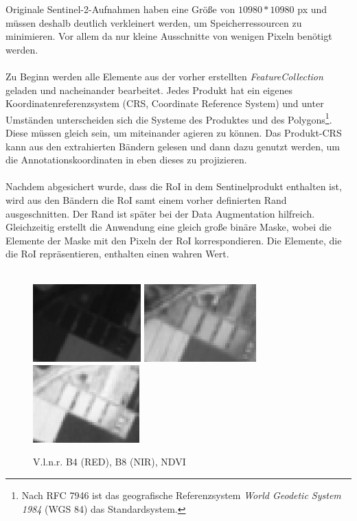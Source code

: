Originale Sentinel-2-Aufnahmen haben eine Größe von $10980*10980$ px und müssen deshalb deutlich verkleinert werden, um Speicherressourcen zu minimieren. Vor allem da nur kleine Ausschnitte von wenigen Pixeln benötigt werden. 
\\\\
Zu Beginn werden alle Elemente aus der vorher erstellten \textit{FeatureCollection} geladen und nacheinander bearbeitet. Jedes Produkt hat ein eigenes Koordinatenreferenzsystem (CRS, Coordinate Reference System) und unter Umständen unterscheiden sich die Systeme des Produktes und des Polygons\footnote{Nach RFC 7946 ist das geografische Referenzsystem \textit{World Geodetic
 System 1984} (WGS 84) das Standardsystem.\cite{ref:rfc7946}}. Diese müssen gleich sein, um miteinander agieren zu können. Das Produkt-CRS kann aus den extrahierten Bändern gelesen und dann dazu genutzt werden, um die Annotationskoordinaten in eben dieses zu projizieren.
 \\\\
 Nachdem abgesichert wurde, dass die RoI in dem Sentinelprodukt enthalten ist, wird aus den Bändern die RoI samt einem vorher definierten Rand ausgeschnitten. Der Rand ist später bei der Data Augmentation hilfreich. Gleichzeitig erstellt die Anwendung eine gleich große binäre Maske, wobei die Elemente der Maske mit den Pixeln der RoI korrespondieren. Die Elemente, die die RoI repräsentieren, enthalten einen wahren Wert.
 \\\\
\begin{figure}[ht]
  \centering
  \includegraphics[height=3cm]{pics/b4.PNG}
  \includegraphics[height=3cm]{pics/b8.PNG}
  \includegraphics[height=3cm]{pics/ndvi.PNG}
  \caption[B4 - B8 - NDVI]{V.l.n.r. B4 (RED), B8 (NIR), NDVI}
  \label{fig:ndvi}
\end{figure}

